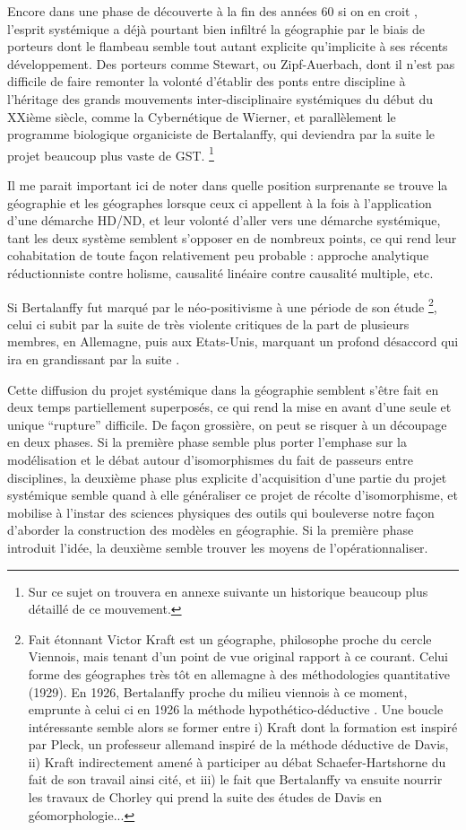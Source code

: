 Encore dans une phase de découverte à la fin des années 60 si on en croit \textcite{Harvey1969}, l'esprit systémique \textcite{Ackerman1963} a déjà pourtant bien infiltré la géographie par le biais de porteurs dont le flambeau semble tout autant explicite qu'implicite à ses récents développement. Des porteurs comme Stewart, ou Zipf-Auerbach, dont il n'est pas difficile de faire remonter la volonté d'établir des ponts entre discipline à l'héritage des grands mouvements inter-disciplinaire systémiques du début du XXième siècle, comme la Cybernétique de Wierner, et parallèlement le programme biologique organiciste de Bertalanffy, qui deviendra par la suite le projet beaucoup plus vaste de GST. \footnote{Sur ce sujet on trouvera en annexe suivante un historique beaucoup plus détaillé de ce mouvement.} 

Il me parait important ici de noter dans quelle position surprenante se trouve la géographie et les géographes lorsque ceux ci appellent à la fois à l'application d'une démarche HD/ND, et leur volonté d'aller vers une démarche systémique, tant les deux système semblent s'opposer en de nombreux points, ce qui rend leur cohabitation de toute façon relativement peu probable : approche analytique réductionniste contre holisme, causalité linéaire contre causalité multiple, etc. 

Si Bertalanffy fut marqué par le néo-positivisme à une période de son étude \footnote{Fait étonnant Victor Kraft est un géographe, philosophe proche du cercle Viennois, mais tenant d'un point de vue original rapport à ce courant. Celui forme des géographes très tôt en allemagne à des méthodologies quantitative (1929). En 1926, Bertalanffy proche du milieu viennois à ce moment, emprunte à celui ci en 1926 la méthode hypothético-déductive \autocite[342]{Pouvreau2013}. Une boucle intéressante semble alors se former entre i) Kraft dont la formation est inspiré par Pleck, un professeur allemand inspiré de la méthode déductive de Davis, ii) Kraft indirectement amené à participer au débat Schaefer-Hartshorne du fait de son travail ainsi cité, et iii) le fait que Bertalanffy va ensuite nourrir les travaux de Chorley qui prend la suite des études de Davis en géomorphologie...}, celui ci subit par la suite de très violente critiques de la part de plusieurs membres, en Allemagne, puis aux Etats-Unis, marquant un profond désaccord qui ira en grandissant par la suite \autocite[26-27]{Pouvreau2006}. 

Cette diffusion du projet systémique dans la géographie semblent s'être fait en deux temps partiellement superposés, ce qui rend la mise en avant d'une seule et unique \enquote{rupture} difficile. De façon grossière, on peut se risquer à un découpage en deux phases. Si la première phase semble plus porter l'emphase sur la modélisation et le débat autour d'isomorphismes du fait de passeurs entre disciplines, la deuxième phase plus explicite d'acquisition d'une partie du projet systémique semble quand à elle généraliser ce projet de récolte d'isomorphisme, et mobilise à l'instar des sciences physiques des outils qui bouleverse notre façon d'aborder la construction des modèles en géographie. Si la première phase introduit l'idée, la deuxième semble trouver les moyens de l’opérationnaliser.

